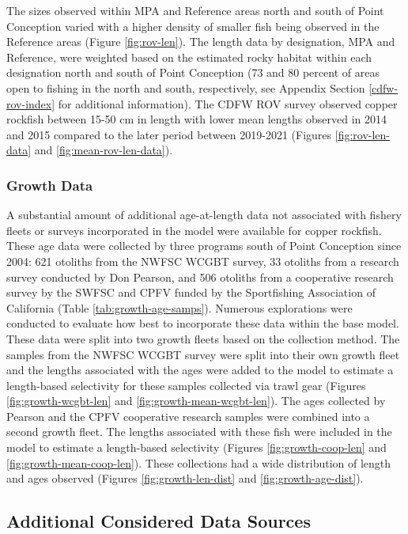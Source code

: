 \documentclass[11pt,
  english,
  letterpaper,
]{article}
\begin{document}
The sizes observed within MPA and Reference areas north and south of Point Conception varied with a higher density of smaller fish being observed in the Reference areas (Figure \ref{fig:rov-len}). The length data by designation, MPA and Reference, were weighted based on the estimated rocky habitat within each designation north and south of Point Conception (73 and 80 percent of areas open to fishing in the north and south, respectively, see Appendix Section \ref{cdfw-rov-index} for additional information). The CDFW ROV survey observed copper rockfish between 15-50 cm in length with lower mean lengths observed in 2014 and 2015 compared to the later period between 2019-2021 (Figures \ref{fig:rov-len-data} and \ref{fig:mean-rov-len-data}).

\hypertarget{growth-data}{%
\subsubsection{Growth Data}\label{growth-data}}

A substantial amount of additional age-at-length data not associated with fishery fleets or surveys incorporated in the model were available for copper rockfish. These age data were collected by three programs south of Point Conception since 2004: 621 otoliths from the NWFSC WCGBT survey, 33 otoliths from a research survey conducted by Don Pearson, and 506 otoliths from a cooperative research survey by the SWFSC and CPFV funded by the Sportfishing Association of California (Table \ref{tab:growth-age-samps}). Numerous explorations were conducted to evaluate how best to incorporate these data within the base model. These data were split into two growth fleets based on the collection method. The samples from the NWFSC WCGBT survey were split into their own growth fleet and the lengths associated with the ages were added to the model to estimate a length-based selectivity for these samples collected via trawl gear (Figures \ref{fig:growth-wcgbt-len} and \ref{fig:growth-mean-wcgbt-len}). The ages collected by Pearson and the CPFV cooperative research samples were combined into a second growth fleet. The lengths associated with these fish were included in the model to estimate a length-based selectivity (Figures \ref{fig:growth-coop-len} and \ref{fig:growth-mean-coop-len}). These collections had a wide distribution of length and ages observed (Figures \ref{fig:growth-len-dist} and \ref{fig:growth-age-dist}).

\hypertarget{additional-considered-data-sources}{%
\subsection{Additional Considered Data Sources}\label{additional-considered-data-sources}}
\end{document}
